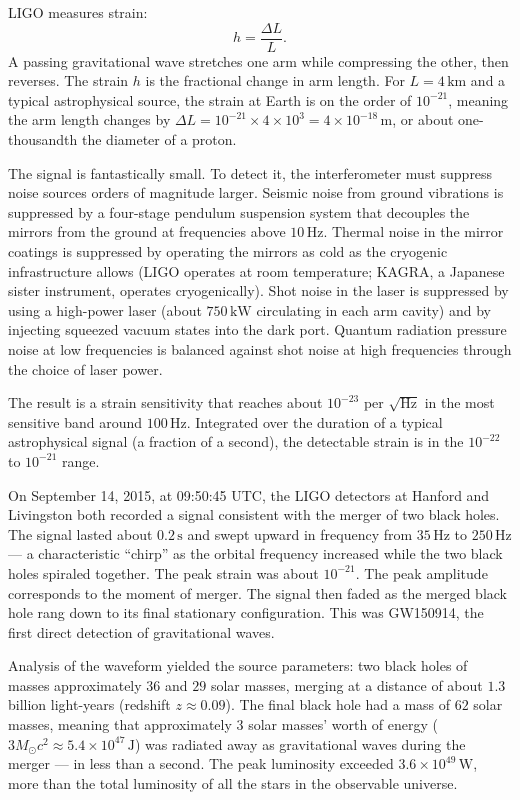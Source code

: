 LIGO measures strain:
\[
h = \frac{\Delta L}{L}.
\label{eq:chapter9-ligo-strain}
\]
A passing gravitational wave stretches one arm while compressing the other,
then reverses. The strain $h$ is the fractional change in arm length. For
$L = 4\,\mathrm{km}$ and a typical astrophysical source, the strain at
Earth is on the order of $10^{-21}$, meaning the arm length changes by
$\Delta L = 10^{-21} \times 4 \times 10^3 = 4 \times 10^{-18}\,\mathrm{m}$,
or about one-thousandth the diameter of a proton.

The signal is fantastically small. To detect it, the interferometer must
suppress noise sources orders of magnitude larger. Seismic noise from
ground vibrations is suppressed by a four-stage pendulum suspension
system that decouples the mirrors from the ground at frequencies above
$10\,\mathrm{Hz}$. Thermal noise in the mirror coatings is suppressed by
operating the mirrors as cold as the cryogenic infrastructure allows
(LIGO operates at room temperature; KAGRA, a Japanese sister
instrument, operates cryogenically). Shot noise in the laser is
suppressed by using a high-power laser (about $750\,\mathrm{kW}$
circulating in each arm cavity) and by injecting squeezed vacuum states
into the dark port. Quantum radiation pressure noise at low frequencies
is balanced against shot noise at high frequencies through the choice
of laser power.

The result is a strain sensitivity that reaches about $10^{-23}$ per
$\sqrt{\mathrm{Hz}}$ in the most sensitive band around
$100\,\mathrm{Hz}$. Integrated over the duration of a typical
astrophysical signal (a fraction of a second), the detectable strain is
in the $10^{-22}$ to $10^{-21}$ range.

On September 14, 2015, at 09:50:45 UTC, the LIGO detectors at Hanford
and Livingston both recorded a signal consistent with the merger of two
black holes. The signal lasted about $0{.}2\,\mathrm{s}$ and swept
upward in frequency from $35\,\mathrm{Hz}$ to $250\,\mathrm{Hz}$ --- a
characteristic ``chirp'' as the orbital frequency increased while the
two black holes spiraled together. The peak strain was about $10^{-21}$.
The peak amplitude corresponds to the moment of merger. The signal then
faded as the merged black hole rang down to its final stationary
configuration. This was GW150914, the first direct detection of
gravitational waves.

Analysis of the waveform yielded the source parameters: two black holes
of masses approximately $36$ and $29$ solar masses, merging at a distance
of about $1{.}3$ billion light-years (redshift $z \approx 0{.}09$). The
final black hole had a mass of $62$ solar masses, meaning that
approximately $3$ solar masses' worth of energy ($3 M_\odot c^2 \approx
5{.}4 \times 10^{47}\,\mathrm{J}$) was radiated away as gravitational
waves during the merger --- in less than a second. The peak luminosity
exceeded $3{.}6 \times 10^{49}\,\mathrm{W}$, more than the total
luminosity of all the stars in the observable universe.

